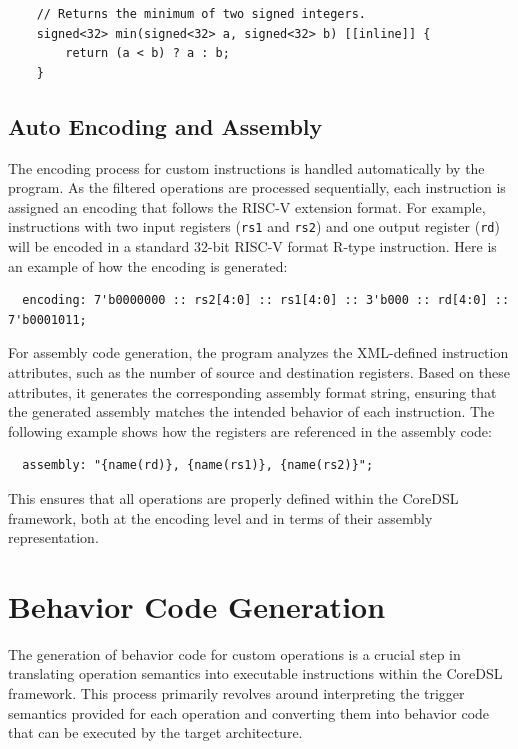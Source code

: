 \begin{lstlisting}
    // Returns the minimum of two signed integers.
    signed<32> min(signed<32> a, signed<32> b) [[inline]] {
        return (a < b) ? a : b;
    }
\end{lstlisting}

\subsection{Auto Encoding and Assembly}

The encoding process for custom instructions is handled automatically by the program. As the filtered operations are processed sequentially, each instruction is assigned an encoding that follows the RISC-V extension format. For example, instructions with two input registers (\texttt{rs1} and \texttt{rs2}) and one output register (\texttt{rd}) will be encoded in a standard 32-bit RISC-V format R-type instruction. Here is an example of how the encoding is generated:

\begin{lstlisting}
  encoding: 7'b0000000 :: rs2[4:0] :: rs1[4:0] :: 3'b000 :: rd[4:0] :: 7'b0001011;
\end{lstlisting}

For assembly code generation, the program analyzes the XML-defined instruction attributes, such as the number of source and destination registers. Based on these attributes, it generates the corresponding assembly format string, ensuring that the generated assembly matches the intended behavior of each instruction. The following example shows how the registers are referenced in the assembly code:

\begin{lstlisting}
  assembly: "{name(rd)}, {name(rs1)}, {name(rs2)}";
\end{lstlisting}

This ensures that all operations are properly defined within the CoreDSL framework, both at the encoding level and in terms of their assembly representation.

\section{Behavior Code Generation}

The generation of behavior code for custom operations is a crucial step in translating operation semantics into executable instructions within the CoreDSL framework. This process primarily revolves around interpreting the trigger semantics provided for each operation and converting them into behavior code that can be executed by the target architecture.

